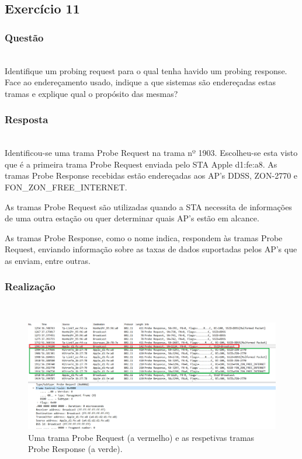 \documentclass{llncs}
\begin{document}
\clearpage
\subsection{Exercício 11}
\subsubsection{Questão}\rule[-10pt]{0pt}{10pt}\\

Identifique um probing request para o qual tenha havido um probing response. Face ao endereçamento usado, indique a que sistemas são endereçadas estas tramas e explique qual o propósito das mesmas?

\subsubsection{Resposta}\rule[-10pt]{0pt}{10pt}\\

Identificou-se uma trama Probe Request na trama nº 1903. Escolheu-se esta visto que é a primeira trama Probe Request enviada pelo STA Apple d1:fe:a8. As tramas Probe Response recebidas estão endereçadas aos AP's DDSS, ZON-2770 e FON_ZON_FREE_INTERNET. 
\par As tramas Probe Request são utilizadas quando a STA necessita de informações de uma outra estação ou quer determinar quais AP's estão em alcance. 
\par As tramas Probe Response, como o nome indica, respondem às tramas Probe Request, enviando informação sobre as taxas de dados suportadas pelos AP's que as enviam, entre outras.

\subsubsection{Realização}\rule[-10pt]{0pt}{10pt}\\

\begin{figure}
  \begin{center}
  \includegraphics[scale=0.35]{imagens/request_response.png} 
  \end{center}
  \caption{Uma trama Probe Request (a vermelho) e as respetivas tramas Probe Response (a verde).}
  \label{fig:probe_filter}
\end{figure}
\end{document}

